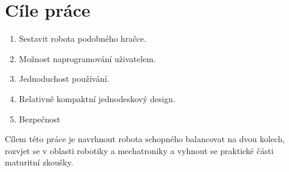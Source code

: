 \chapter*{Cíle práce}
%
%

\begin{enumerate}
	\item Sestavit robota podobného hračce.
	\item Možnost naprogramování uživatelem.
	\item Jednoduchost používání.
	\item Relativně kompaktní jednodeskový design.\\
	\item Bezpečnost
\end{enumerate}%
Cílem této práce je navrhnout robota schopného balancovat na dvou kolech, rozvjet se v oblasti robotiky a mechatroniky a vyhnout se praktické části maturitní zkoušky.